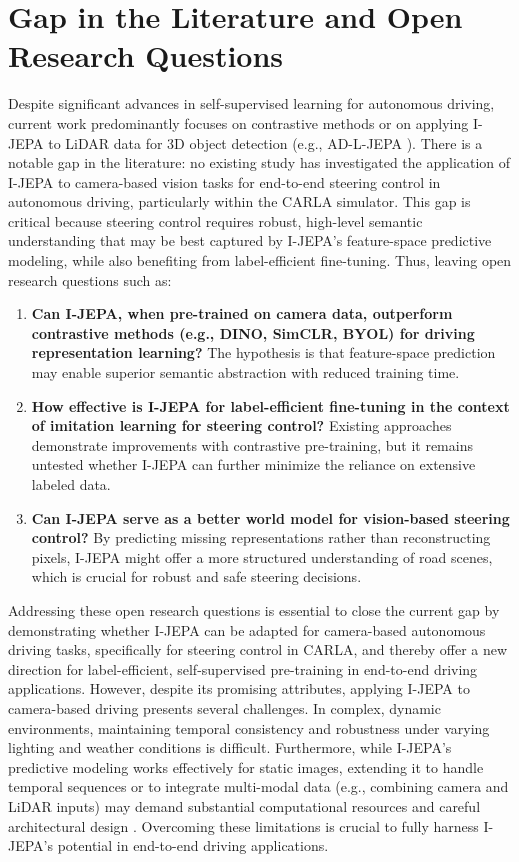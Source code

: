\documentclass{article}
\begin{document}
\section{Gap in the Literature and Open Research Questions}
Despite significant advances in self-supervised learning for autonomous driving, current work predominantly focuses on contrastive methods or on applying I-JEPA to LiDAR data for 3D object detection (e.g., AD-L-JEPA \citep{zhu2025ad}). There is a notable gap in the literature: no existing study has investigated the application of I-JEPA to camera-based vision tasks for end-to-end steering control in autonomous driving, particularly within the CARLA simulator. This gap is critical because steering control requires robust, high-level semantic understanding that may be best captured by I-JEPA's feature-space predictive modeling, while also benefiting from label-efficient fine-tuning. Thus, leaving open research questions such as:
\begin{enumerate}
    \item \textbf{Can I-JEPA, when pre-trained on camera data, outperform contrastive methods (e.g., DINO, SimCLR, BYOL) for driving representation learning?} The hypothesis is that feature-space prediction may enable superior semantic abstraction with reduced training time.
    \item \textbf{How effective is I-JEPA for label-efficient fine-tuning in the context of imitation learning for steering control?} Existing approaches demonstrate improvements with contrastive pre-training, but it remains untested whether I-JEPA can further minimize the reliance on extensive labeled data.
    \item \textbf{Can I-JEPA serve as a better world model for vision-based steering control?} By predicting missing representations rather than reconstructing pixels, I-JEPA might offer a more structured understanding of road scenes, which is crucial for robust and safe steering decisions.
\end{enumerate}

Addressing these open research questions is essential to close the current gap by demonstrating whether I-JEPA can be adapted for camera-based autonomous driving tasks, specifically for steering control in CARLA, and thereby offer a new direction for label-efficient, self-supervised pre-training in end-to-end driving applications. However, despite its promising attributes, applying I-JEPA to camera-based driving presents several challenges. In complex, dynamic environments, maintaining temporal consistency and robustness under varying lighting and weather conditions is difficult. Furthermore, while I-JEPA’s predictive modeling works effectively for static images, extending it to handle temporal sequences or to integrate multi-modal data (e.g., combining camera and LiDAR inputs) may demand substantial computational resources and careful architectural design \citep{assran2023self, zhu2025ad}. Overcoming these limitations is crucial to fully harness I-JEPA’s potential in end-to-end driving applications.
\end{document}
